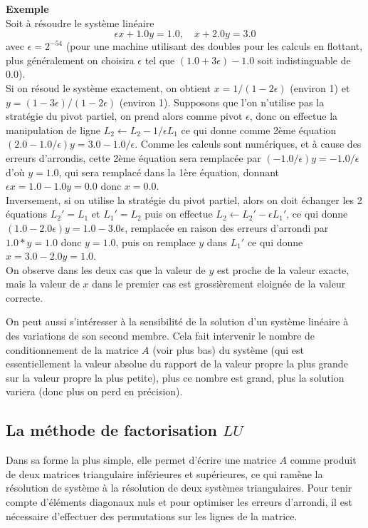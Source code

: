 \documentclass[a4paper,11pt]{article}
\begin{document}
\begin{giacjshere}
{\bf Exemple}\\
Soit \`a r\'esoudre le syst\`eme lin\'eaire
\[ \epsilon x + 1.0 y = 1.0 , \quad x + 2.0 y = 3.0 \]
avec $\epsilon =2^{-54}$ (pour une machine utilisant des doubles pour
les calculs en flottant,
plus g\'en\'eralement on choisira $\epsilon$ tel que $(1.0+3\epsilon)-1.0$
soit indistinguable de 0.0).\\
Si on r\'esoud le syst\`eme exactement,
on obtient $x=1/(1-2\epsilon)$ (environ 1)
et $y=(1-3\epsilon)/(1-2\epsilon)$ (environ 1).
Supposons que l'on n'utilise pas la strat\'egie du pivot partiel,
on prend alors comme pivot $\epsilon$, donc on effectue la
manipulation de ligne $L_2 \leftarrow L_2 - 1/\epsilon L_1$ ce qui
donne comme 2\`eme \'equation $(2.0-1.0/\epsilon)y=3.0-1.0/\epsilon$.
Comme les calculs sont num\'eriques, et \`a cause des erreurs
d'arrondis, cette 2\`eme \'equation sera remplac\'ee par
$(-1.0/\epsilon)y=-1.0/\epsilon$ d'o\`u $y=1.0$, qui sera remplac\'e
dans la 1\`ere \'equation, donnant $\epsilon x = 1.0-1.0y=0.0$ donc
$x=0.0$.\\
Inversement, si on utilise la strat\'egie du pivot partiel, alors
on doit \'echanger les 2 \'equations $L_2'=L_1$ et $L_1'=L_2$ puis on effectue
$L_2 \leftarrow L_2' - \epsilon L_1'$, ce qui donne
$(1.0-2.0\epsilon) y = 1.0 - 3.0 \epsilon $, remplac\'ee en raison
des erreurs d'arrondi par $1.0*y=1.0$ donc $y=1.0$, puis on remplace
$y$ dans $L_1'$ ce qui donne $x=3.0-2.0y=1.0$.\\
On observe dans les deux cas que la valeur de $y$ est proche de la
valeur exacte, mais la valeur de $x$ dans le premier cas est
grossi\`erement eloign\'ee de la valeur correcte.

On peut aussi s'intéresser à la sensibilité de la solution d'un
système linéaire à des variations de son second membre. Cela fait intervenir
le nombre de conditionnement de la matrice $A$ (voir plus bas) du système (qui
est essentiellement la valeur absolue du rapport de la valeur propre
la plus grande sur la valeur propre la plus petite), plus
ce nombre est grand, plus la solution variera (donc plus on
perd en précision).

\subsection{La méthode de factorisation $LU$} 
Dans sa forme la plus simple, elle permet d'écrire
une matrice $A$ comme produit de deux matrices triangulaire
inférieures et supérieures, ce qui ram\`ene la résolution
de système à la résolution de deux systèmes triangulaires.
Pour tenir compte d'\'el\'ements diagonaux nuls et pour optimiser 
les erreurs d'arrondi, il est n\'ecessaire d'effectuer des
permutations sur les lignes de la matrice.


\end{giacjshere}
\end{document}
